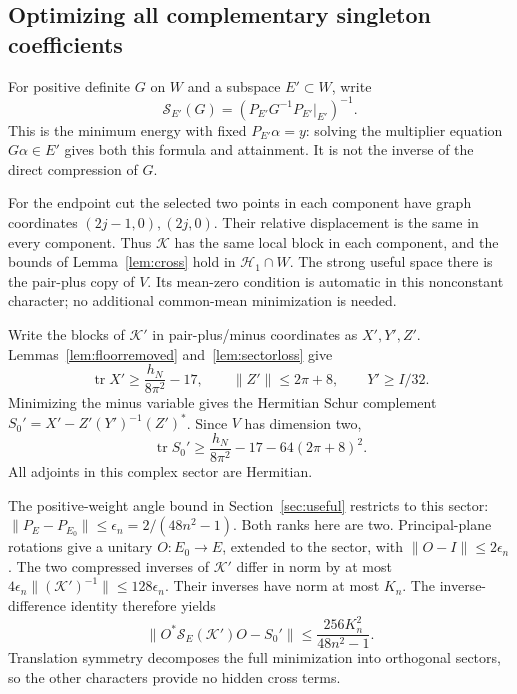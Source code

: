 \documentclass[11pt]{article}
\newcommand{\norm}[1]{\lVert#1\rVert}
\DeclareMathOperator{\tr}{tr}
\theoremstyle{definition}
\theoremstyle{remark}
\begin{document}
\subsection{Optimizing all complementary singleton coefficients}
For positive definite $G$ on $W$ and a subspace $E'\subset W$, write
\[
 \mathcal S_{E'}(G)=(P_{E'}G^{-1}P_{E'}|_{E'})^{-1}.
\]
This is the minimum energy with fixed $P_{E'}\alpha=y$: solving the
multiplier equation $G\alpha\in E'$ gives both this formula and
attainment. It is not the inverse of the direct compression of $G$.

For the endpoint cut the selected two points in each component have
graph coordinates $(2j-1,0),(2j,0)$. Their relative displacement is the
same in every component. Thus $\mathcal K$ has the same local block in
each component, and the bounds of Lemma~\ref{lem:cross} hold in
$\mathcal H_1\cap W$. The strong useful space there is the pair-plus
copy of $V$. Its mean-zero condition is automatic in this nonconstant
character; no additional common-mean minimization is needed.

Write the blocks of $\mathcal K'$ in pair-plus/minus coordinates as
$X',Y',Z'$. Lemmas~\ref{lem:floorremoved} and~\ref{lem:sectorloss} give
\[
 \tr X'\ge\frac{h_N}{8\pi^2}-17,\qquad
 \norm{Z'}\le2\pi+8,\qquad Y'\ge I/32.
\]
Minimizing the minus variable gives the Hermitian Schur complement
$S_0'=X'-Z'(Y')^{-1}(Z')^*$. Since $V$ has dimension two,
\begin{equation}\label{eq:sectortrace}
 \tr S_0'\ge\frac{h_N}{8\pi^2}-17-64(2\pi+8)^2.
\end{equation}
All adjoints in this complex sector are Hermitian.

The positive-weight angle bound in Section~\ref{sec:useful} restricts
to this sector: $\norm{P_E-P_{E_0}}\le\epsilon_n=2/(48n^2-1)$.
Both ranks here are two. Principal-plane rotations give a unitary
$O:E_0\to E$, extended to the sector, with $\norm{O-I}\le2\epsilon_n$.
The two compressed inverses of $\mathcal K'$ differ in norm by at most
$4\epsilon_n\norm{(\mathcal K')^{-1}}\le128\epsilon_n$.
Their inverses have norm at most $K_n$. The inverse-difference identity
therefore yields
\begin{equation}\label{eq:sectorrotation}
 \norm{O^*\mathcal S_E(\mathcal K')O-S_0'}
       \le\frac{256K_n^2}{48n^2-1}.
\end{equation}
Translation symmetry decomposes the full minimization into orthogonal
sectors, so the other characters provide no hidden cross terms.
\end{document}
